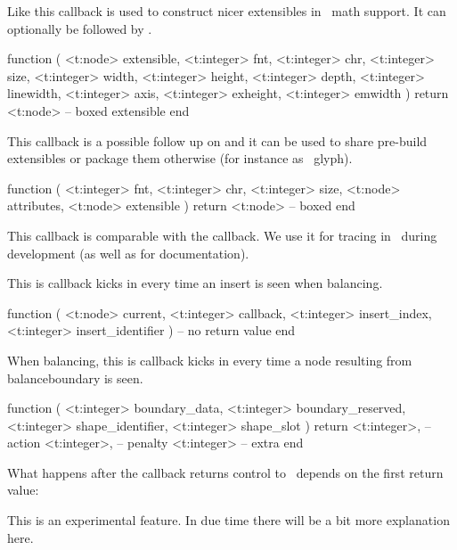 \stopsubsection

\startsubsection[title=make_extensible]

Like  this callback is used to construct nicer extensibles in \CONTEXT\
math support. It can optionally be followed by .

\starttyping[option=LUA]
function (
    <t:node>    extensible,
    <t:integer> fnt,
    <t:integer> chr,
    <t:integer> size,
    <t:integer> width,
    <t:integer> height,
    <t:integer> depth,
    <t:integer> linewidth,
    <t:integer> axis,
    <t:integer> exheight,
    <t:integer> emwidth
)
    return <t:node> -- boxed extensible
end
\stoptyping

\stopsubsection

\startsubsection[title=register_extensible]

This callback is a possible follow up on  and it can be
used to share pre-build extensibles or package them otherwise (for instance as
\TYPETHREE\ glyph).

\starttyping[option=LUA]
function (
    <t:integer> fnt,
    <t:integer> chr,
    <t:integer> size,
    <t:node>    attributes,
    <t:node>    extensible
)
    return <t:node> -- boxed
end
\stoptyping

\stopsubsection

\startsubsection[title=balance]

This callback is comparable with the  callback. We use it for
tracing in \CONTEXT\ during development (as well as for documentation).

\stopsubsection

\startsubsection[title=balance_insert]

This is callback kicks in every time an insert is seen when balancing.

\starttyping[option=LUA]
function (
    <t:node>    current,
    <t:integer> callback,
    <t:integer> insert_index,
    <t:integer> insert_identifier
)
    -- no return value
end
\stoptyping

\startsubsection[title=balance_boundary]

When balancing, this is callback kicks in every time a node resulting from \prm
{balanceboundary} is seen.

\starttyping[option=LUA]
function (
    <t:integer> boundary_data,
    <t:integer> boundary_reserved,
    <t:integer> shape_identifier,
    <t:integer> shape_slot
)
    return
        <t:integer>, -- action
        <t:integer>, -- penalty
        <t:integer>  -- extra
end
\stoptyping

What happens after the callback returns control to \TEX\ depends on the first
return value:


This is an experimental feature. In due time there will be a bit more explanation
here.

\stopsubsection

\stopsection

\stopdocument

